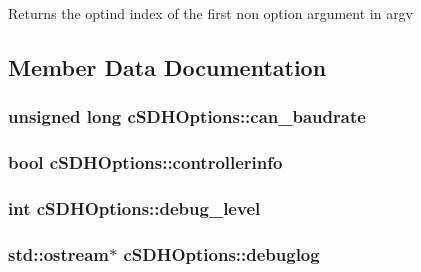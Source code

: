 \begin{DoxyReturn}{\-Returns}
the optind index of the first non option argument in argv 
\end{DoxyReturn}


\subsection{\-Member \-Data \-Documentation}
\hypertarget{classcSDHOptions_a2376bfefe00e6f9832c16a979b99bf92}{
\subsubsection[{can\-\_\-baudrate}]{\setlength{\rightskip}{0pt plus 5cm}unsigned long {\bf c\-S\-D\-H\-Options\-::can\-\_\-baudrate}}}\label{classcSDHOptions_a2376bfefe00e6f9832c16a979b99bf92}
\hypertarget{classcSDHOptions_a3e1089848fb7702f5e94dd673601f463}{
\subsubsection[{controllerinfo}]{\setlength{\rightskip}{0pt plus 5cm}bool {\bf c\-S\-D\-H\-Options\-::controllerinfo}}}\label{classcSDHOptions_a3e1089848fb7702f5e94dd673601f463}
\hypertarget{classcSDHOptions_a3cf6556a2758bf431b4e93e5c2adefb7}{
\subsubsection[{debug\-\_\-level}]{\setlength{\rightskip}{0pt plus 5cm}int {\bf c\-S\-D\-H\-Options\-::debug\-\_\-level}}}\label{classcSDHOptions_a3cf6556a2758bf431b4e93e5c2adefb7}
\hypertarget{classcSDHOptions_a71ac0c016aeb7cc34c521d06fa905198}{
\subsubsection[{debuglog}]{\setlength{\rightskip}{0pt plus 5cm}std\-::ostream$\ast$ {\bf c\-S\-D\-H\-Options\-::debuglog}}}\label{classcSDHOptions_a71ac0c016aeb7cc34c521d06fa905198}
